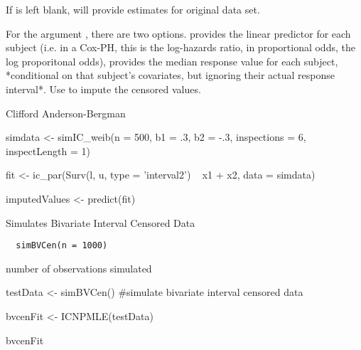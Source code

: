\documentclass[a4paper]{book}
\begin{document}
%
\begin{Details}\relax
 	
If  is left blank, will provide estimates for original data set. 

For the argument , there are two options.  provides the linear predictor for each subject (i.e. in a Cox-PH, this is the log-hazards ratio, in proportional odds, the log proporitonal odds),  provides the median response value for each subject, *conditional on that subject's covariates, but ignoring their actual response interval*. Use  to impute the censored values. 
\end{Details}
%
\begin{Author}\relax
Clifford Anderson-Bergman
\end{Author}
%
\begin{Examples}
\begin{ExampleCode}

simdata <- simIC_weib(n = 500, b1 = .3, b2 = -.3,
                      inspections = 6, inspectLength = 1)
  
fit <- ic_par(Surv(l, u, type = 'interval2') ~ x1 + x2,
                   data = simdata)

imputedValues <- predict(fit)
\end{ExampleCode}
\end{Examples}
%
\begin{Description}\relax
Simulates Bivariate Interval Censored Data
\end{Description}
%
\begin{Usage}
\begin{verbatim}
  simBVCen(n = 1000)
\end{verbatim}
\end{Usage}
%
\begin{Arguments}
\begin{ldescription}
\item[\code{n}] number of observations simulated

\end{ldescription}
\end{Arguments}
%
\begin{Examples}
\begin{ExampleCode}
  testData <- simBVCen()
  #simulate bivariate interval censored data
  
 bvcenFit <- ICNPMLE(testData)
 
 bvcenFit
\end{ExampleCode}
\end{Examples}
\end{document}
